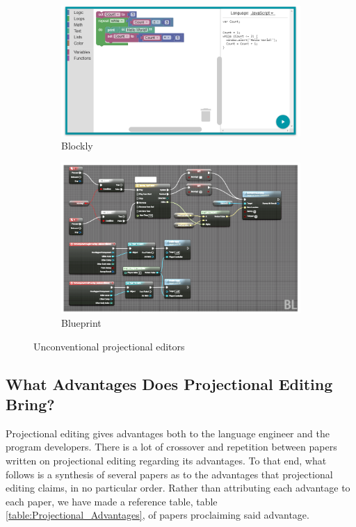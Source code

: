 \begin{figure}[H]
    \begin{subfigure}{.50\textwidth}
      \centering
      \includegraphics[width=.95\linewidth]{Sections/images/blockly.png}
      \caption{Blockly}
      \label{fig:blockly}
    \end{subfigure}%
    \begin{subfigure}{.50\textwidth}
      \centering
      \includegraphics[width=.95\linewidth]{Sections/images/blueprint.png}
      \caption{Blueprint}
      \label{fig:Blueprint}
    \end{subfigure}
    \caption{Unconventional projectional editors}
    \label{fig:leftfield}
\end{figure}

\subsection{What Advantages Does Projectional Editing Bring?}
\label{section:projectional_advantages}

Projectional editing gives advantages both to the language engineer and the program developers.
There is a lot of crossover and repetition between papers written on projectional editing regarding its advantages.
To that end, what follows is a synthesis of several papers as to the advantages that projectional editing claims, in no particular order.
Rather than attributing each advantage to each paper, we have made a reference table, table \ref{table:Projectional_Advantages}, of papers proclaiming said advantage.


